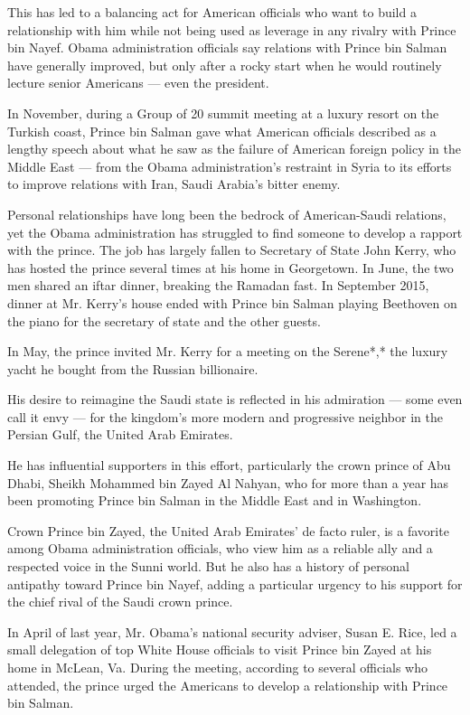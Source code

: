 This has led to a balancing act for American officials who want to build
a relationship with him while not being used as leverage in any rivalry
with Prince bin Nayef. Obama administration officials say relations with
Prince bin Salman have generally improved, but only after a rocky start
when he would routinely lecture senior Americans --- even the president.

In November, during a Group of 20 summit meeting at a luxury resort on
the Turkish coast, Prince bin Salman gave what American officials
described as a lengthy speech about what he saw as the failure of
American foreign policy in the Middle East --- from the Obama
administration's restraint in Syria to its efforts to improve relations
with Iran, Saudi Arabia's bitter enemy.

Personal relationships have long been the bedrock of American-Saudi
relations, yet the Obama administration has struggled to find someone to
develop a rapport with the prince. The job has largely fallen to
Secretary of State John Kerry, who has hosted the prince several times
at his home in Georgetown. In June, the two men shared an iftar dinner,
breaking the Ramadan fast. In September 2015, dinner at Mr. Kerry's
house ended with Prince bin Salman playing Beethoven on the piano for
the secretary of state and the other guests.

In May, the prince invited Mr. Kerry for a meeting on the Serene*,* the
luxury yacht he bought from the Russian billionaire.

His desire to reimagine the Saudi state is reflected in his admiration
--- some even call it envy --- for the kingdom's more modern and
progressive neighbor in the Persian Gulf, the United Arab Emirates.

He has influential supporters in this effort, particularly the crown
prince of Abu Dhabi, Sheikh Mohammed bin Zayed Al Nahyan, who for more
than a year has been promoting Prince bin Salman in the Middle East and
in Washington.

Crown Prince bin Zayed, the United Arab Emirates' de facto ruler, is a
favorite among Obama administration officials, who view him as a
reliable ally and a respected voice in the Sunni world. But he also has
a history of personal antipathy toward Prince bin Nayef, adding a
particular urgency to his support for the chief rival of the Saudi crown
prince.

In April of last year, Mr. Obama's national security adviser, Susan E.
Rice, led a small delegation of top White House officials to visit
Prince bin Zayed at his home in McLean, Va. During the meeting,
according to several officials who attended, the prince urged the
Americans to develop a relationship with Prince bin Salman.

